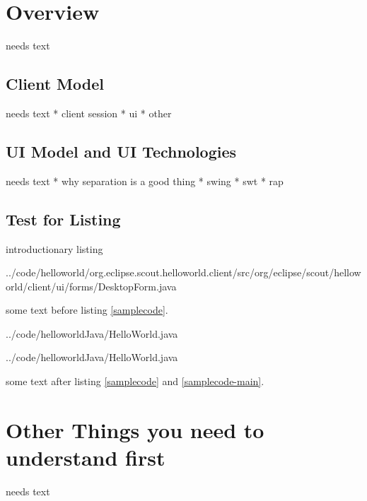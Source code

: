 \documentclass[a4paper,10pt,twoside]{book}
\begin{document}
  \sloppy
\fi


\chapter{Overview}
needs text
  
\section{Client Model}
needs text
  * client session
  * ui
  * other
  
\section{UI Model and UI Technologies}
needs text
  * why separation is a good thing
  * swing
  * swt
  * rap

\section{Test for Listing}

introductionary listing


{../code/helloworld/org.eclipse.scout.helloworld.client/src/org/eclipse/scout/helloworld/client/ui/forms/DesktopForm.java}


some text before listing \ref{samplecode}.


{../code/helloworldJava/HelloWorld.java}



{../code/helloworldJava/HelloWorld.java}


some text after listing \ref{samplecode} and \ref{samplecode-main}.

\chapter{Other Things you need to understand first}
needs text
  
\end{document}

